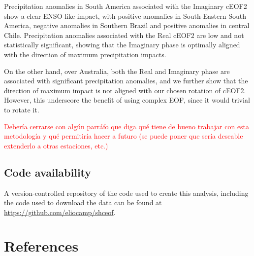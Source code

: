 \documentclass[smallextended]{svjour3}       %
\begin{document}
Precipitation anomalies in South America associated with the Imaginary cEOF2 show a clear ENSO-like impact, with positive anomalies in South-Eastern South America, negative anomalies in Southern Brazil and positive anomalies in central Chile.
Precipitation anomalies associated with the Real cEOF2 are low and not statistically significant, showing that the Imaginary phase is optimally aligned with the direction of maximum precipitation impacts.

On the other hand, over Australia, both the Real and Imaginary phase are associated with significant precipitation anomalies, and we further show that the direction of maximum impact is not aligned with our chosen rotation of cEOF2.
However, this underscore the benefit of using complex EOF, since it would trivial to rotate it.

\textcolor{red}{Debería cerrarse con algún parráfo que diga qué tiene de bueno trabajar con esta metodología y qué permitiría hacer a futuro (se puede poner que sería deseable extenderlo a otras estaciones, etc.)}

\hypertarget{code-availability}{%
\subsection*{Code availability}\label{code-availability}}

A version-controlled repository of the code used to create this analysis, including the code used to download the data can be found at \url{https://github.com/eliocamp/shceof}.

\hypertarget{references}{%
\section{References}\label{references}}




\end{document}

